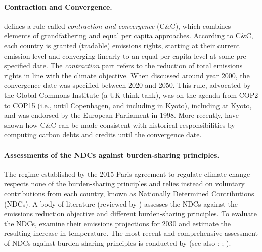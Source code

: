 \paragraph{Contraction and Convergence.}  defines a rule called \textit{contraction and convergence} (C\&C), which combines elements of grandfathering and equal per capita approaches. According to C\&C, each country is granted (tradable) emissions rights, starting at their current emission level and converging linearly to an equal per capita level at some pre-specified date. The \textit{contraction} part refers to the reduction of total emissions rights in line with the climate objective. When discussed around year 2000, the convergence date was specified between 2020 and 2050. This rule, advocated by the Global Commons Institute (a UK think tank), was on the agenda from COP2 to COP15 (i.e., until Copenhagen, and including in Kyoto), including at Kyoto, and was endorsed by the European Parliament in 1998. More recently,  have shown how C\&C can be made consistent with historical responsibilities by computing carbon debts and credits until the convergence date.


\paragraph{Assessments of the NDCs against burden-sharing principles.} 
The regime established by the 2015 Paris agreement to regulate climate change respects none of the burden-sharing principles and relies instead on voluntary contributions from each country, known as Nationally Determined Contributions (NDCs). A body of literature (reviewed by ) assesses the NDCs against the emissions reduction objective and different burden-sharing principles. To evaluate the NDCs,  examine their emissions projections for 2030 and estimate the resulting increase in temperature. The most recent and comprehensive assessment of NDCs against burden-sharing principles is conducted by  (see also ; ; ). 

